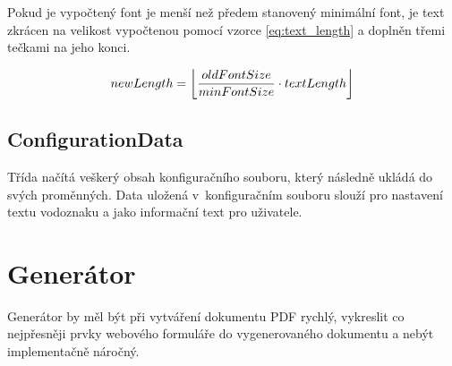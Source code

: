 Pokud je vypočtený font je menší než předem stanovený minimální font, je text zkrácen na velikost vypočtenou pomocí vzorce  \eqref{eq:text_length} a doplněn třemi tečkami na jeho konci. 

\begin{equation}
newLength = \floor*{\frac{oldFontSize}{minFontSize} \cdot textLength} \label{eq:text_length}
\end{equation}
\subsection{ConfigurationData}
Třída načítá veškerý obsah konfiguračního souboru, který následně ukládá do svých proměnných. Data uložená v~konfiguračním souboru slouží pro nastavení textu vodoznaku a jako informační text pro uživatele.
\section{Generátor}
Generátor by měl být při vytváření dokumentu PDF rychlý, vykreslit co nejpřesněji prvky webového formuláře do vygenerovaného dokumentu a nebýt implementačně náročný.
